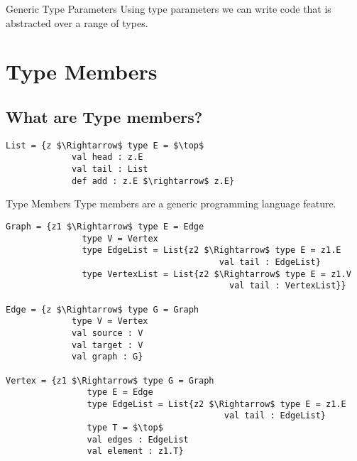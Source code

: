 \documentclass[dvipsnames]{beamer}
\begin{document}
\begin{frame}{Generic Type Parameters}
Using type parameters we can write code that is abstracted over a range of types.
\begin{example}
\usebox{\tpExList}
\end{example}
\end{frame}

\section{Type Members}

\subsection{What are Type members?}

\begin{lrbox}{\tmExList}
\begin{lstlisting}[mathescape, style=customlang]
List = {z $\Rightarrow$ type E = $\top$
             val head : z.E
             val tail : List
             def add : z.E $\rightarrow$ z.E}
\end{lstlisting}
\end{lrbox}

\begin{frame}{Type Members}
Type members are a generic programming language feature.
\begin{example}
\usebox{\tmExList}
\end{example}
\end{frame}

\begin{lrbox}{\tmExA}
\begin{lstlisting}[mathescape, style=customlang]
Graph = {z1 $\Rightarrow$ type E = Edge
               type V = Vertex
               type EdgeList = List{z2 $\Rightarrow$ type E = z1.E 
                                          val tail : EdgeList}
               type VertexList = List{z2 $\Rightarrow$ type E = z1.V
                                            val tail : VertexList}}

Edge = {z $\Rightarrow$ type G = Graph
             type V = Vertex
             val source : V
             val target : V
             val graph : G}
             
Vertex = {z1 $\Rightarrow$ type G = Graph
                type E = Edge
                type EdgeList = List{z2 $\Rightarrow$ type E = z1.E
                                           val tail : EdgeList}
                type T = $\top$
                val edges : EdgeList
                val element : z1.T}
\end{lstlisting}
\end{lrbox}
\end{document}
